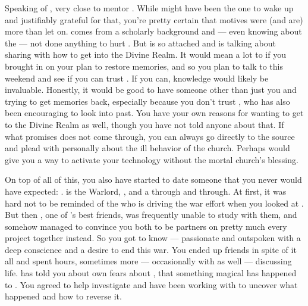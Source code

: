 \documentclass[char]{GL2020}
\begin{document}
Speaking of \cDisney{}, \cDisney{\theyare} very close to \cDisney{\their} mentor \cWildCard{\intro}. While \cWildCard{} might have been the one to wake \cDisney{} up and \cDisney{\theyare} justifiably grateful for that, you're pretty certain that \cWildCard{\their} motives were (and are) more than \cWildCard{\they} let\cWildCard{\verbs} on. \cWildCard{} comes from a scholarly background and — even knowing about the \cDisneySect{} — \cWildCard{\theyhave} not done anything to hurt \cDisney{}. But \cDisney{} is so attached and is talking about sharing with \cWildCard{} how to get into the Divine Realm. It would mean a lot to \cDisney{} if you brought \cWildCard{} in on your plan to restore \cDisney{\their} memories, and so you plan to talk to \cWildCard{\them} this weekend and see if you can trust \cWildCard{\them}. If you can, \cWildCard{\their} knowledge would likely be invaluable. Honestly, it would be good to have someone other than just you and \cDisney{} trying to get \cDisney{\their} memories back, especially because you don’t trust \cPirateChild{}, who has also been encouraging \cDisney{} to look into \cDisney{\their} past. You have your own reasons for wanting to get to the Divine Realm as well, though you have not told anyone about that. If what \cChupInventor{} promises does not come through, you can always go directly to the source and plead with \cTechGod{} personally about the ill behavior of the church. Perhaps \cTechGod{} would give you a way to activate your technology without the mortal church’s blessing.

On top of all of this, you also have started to date someone that you never would have expected: \cWarlordDaughter{\intro}. \cWarlordDaughter{} is the \pShippie{} Warlord, \cLoud{\intros} \cWarlordDaughter{\offspring}, and a \pShippie{} through and through. At first, it was hard not to be reminded of the \cLoud{\person} who is driving the war effort when you looked at \cWarlordDaughter{\them}. But then \cInitiate{\intro}, one of \cWarlordDaughter{}’s best friends, was frequently unable to study with them, and somehow managed to convince you both to be partners on pretty much every project together instead. So you got to know \cWarlordDaughter{} — passionate and outspoken with a deep conscience and a desire to end this war. You ended up friends in spite of it all and spent hours, sometimes more — occasionally with \cScholarship{} as well — discussing life. \cWarlordDaughter{} has told you about \cWarlordDaughter{\their} own fears about \cWarlordDaughter{\their} \cLoud{\parent}, that something magical has happened to \cLoud{\them}. You agreed to help investigate and have been working with \cWarlordDaughter{\them} to uncover what happened and how to reverse it. 
\end{document}
